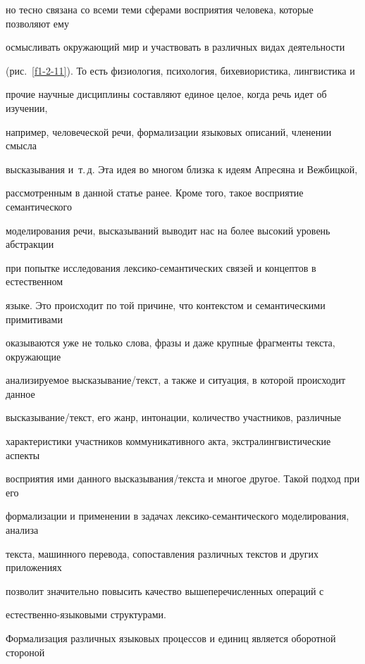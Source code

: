 но тесно связана со всеми теми сферами восприятия человека, которые позволяют ему 


осмысливать окружающий мир и участвовать в различных видах деятельности 


(рис.~\ref{f1-2-11}). То есть физиология, психология, бихевиористика, лингвистика и 


прочие научные дисциплины составляют единое целое, когда речь идет об изучении, 


например, человеческой речи, формализации языковых описаний, членении смысла 


высказывания и~т.\,д. Эта идея во многом близка к идеям Апресяна и Вежбицкой, 


рассмотренным в данной статье ранее. Кроме того, такое восприятие семантического 


моделирования речи, высказываний выводит нас на более высокий уровень абстракции 


при попытке исследования лексико-се\-ман\-ти\-че\-ских связей и концептов в естественном 


языке. Это происходит по той причине, что контекстом и семантическими примитивами 


оказываются уже не только слова, фразы и даже крупные фрагменты текста, окружающие 


анализируемое высказывание/текст, а также и ситуация, в которой происходит данное 


высказывание/текст, его жанр, интонации, количество участников, различные 


характеристики участников коммуникативного акта, экстралингвистические аспекты 


восприятия ими данного высказывания/текста и многое другое. Такой подход при его 


формализации и применении в задачах лексико-семантического моделирования, анализа 


текста, машинного перевода, сопоставления различных текстов и других приложениях 


позволит значительно повысить качество вышеперечисленных операций с 


   естественно-языковыми струк\-ту\-рами.


   {


   


   }


   


   Формализация различных языковых процессов и единиц является оборотной стороной 


